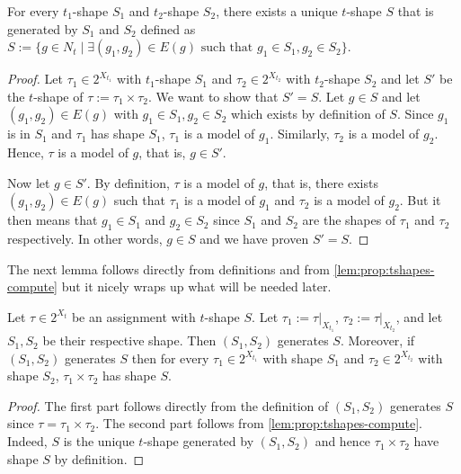 \documentclass[a4paper,UKenglish,cleveref, autoref, thm-restate]{lipics-v2021}
\begin{document}
\begin{toappendix}
\begin{lemma}
	\label{lem:prop:tshapes-compute}
	For every $t_1$-shape $S_1$ and $t_2$-shape $S_2$,  there exists a unique $t$-shape $S$ that is generated by $S_1$ and $S_2$ defined as $S := \{ g \in N_t \mid \exists (g_1,g_2) \in E(g) \text{ such that } g_1 \in S_1, g_2 \in S_2 \}$.
\end{lemma}
\begin{proof}
	Let $\tau_1 \in 2^{X_{t_1}}$ with $t_1$-shape $S_1$ and $\tau_2 \in 2^{X_{t_2}}$ with $t_2$-shape $S_2$ and let $S'$ be the $t$-shape of $\tau := \tau_1 \times \tau_2$. We want to show that $S'=S$. Let $g \in S$ and let $(g_1,g_2) \in E(g)$ with $g_1\in S_1, g_2 \in S_2$ which exists by definition of $S$. Since $g_1$ is in $S_1$ and $\tau_1$ has  shape  $S_1$, $\tau_1$ is a model of $g_1$. Similarly, $\tau_2$ is a model of $g_2$. Hence, $\tau$ is a model of $g$, that is, $g \in S'$.
	
	Now let $g \in S'$. By definition, $\tau$ is a model of $g$, that is, there exists $(g_1,g_2) \in E(g)$ such that $\tau_1$ is a model of $g_1$ and $\tau_2$ is a model of $g_2$. But it then means that $g_1 \in S_1$ and $g_2 \in S_2$ since $S_1$ and $S_2$ are the shapes of $\tau_1$ and $\tau_2$ respectively. In other words, $g \in S$ and we have proven $S'=S$.
\end{proof}

The next lemma follows directly from definitions and from \cref{lem:prop:tshapes-compute} but it nicely wraps up what will be needed later.

\begin{lemma}
	\label{lem:prop:tshapes-complete}
	
	Let $\tau \in 2^{X_t}$ be an assignment with $t$-shape $S$. Let $\tau_1 := \tau|_{X_{t_1}}$, $\tau_2 := \tau|_{X_{t_2}}$, and let $S_1,S_2$ be their respective shape. Then $(S_1,S_2)$ generates $S$. Moreover, if $(S_1,S_2)$ generates $S$ then for every $\tau_1 \in 2^{X_{t_1}}$ with shape $S_1$ and $\tau_2 \in 2^{X_{t_2}}$ with shape $S_2$, $\tau_1 \times \tau_2$ has shape $S$. 
\end{lemma}
\begin{proof}
	The first part follows directly from the definition of $(S_1,S_2)$ generates $S$ since $\tau = \tau_1 \times \tau_2$. The second part follows from \cref{lem:prop:tshapes-compute}. Indeed,  $S$ is the unique $t$-shape generated by $(S_1,S_2)$ and hence $\tau_1 \times \tau_2$ have shape $S$ by definition.
\end{proof}



\end{toappendix}
\end{document}
